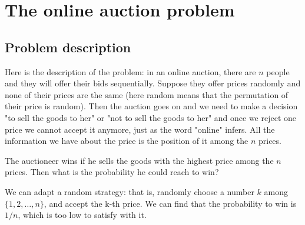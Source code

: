 \documentclass{scribe}
\begin{document}
\section{The online auction problem}

\subsection{Problem description}

Here is the description of the problem: in an online auction, there are $n$ people and they will offer their bids sequentially. Suppose they offer prices randomly and none of their prices are the same (here random means that the permutation of their price is random). Then the auction goes on and we need to make a decision "to sell the goods to her" or "not to sell the goods to her" and once we reject one price we cannot accept it anymore, just as the word "online" infers. All the information we have about the price is the position of it among the $n$ prices.

The auctioneer wins if he sells the goods with the highest price among the $n$ prices. Then what is the probability he could reach to win?

We can adapt a random strategy: that is, randomly choose a number $k$ among $\{1, 2,\dots, n\}$, and accept the k-th price. We can find that the probability to win is $1/n$, which is too low to satisfy with it.
\end{document}
